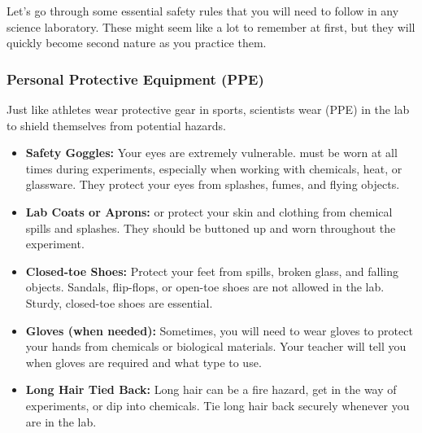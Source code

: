 Let’s go through some essential safety rules that you will need to follow in any science laboratory. These might seem like a lot to remember at first, but they will quickly become second nature as you practice them.

\subsubsection{Personal Protective Equipment (PPE)}

Just like athletes wear protective gear in sports, scientists wear  (PPE) in the lab to shield themselves from potential hazards.

\begin{itemize}
    \item \textbf{Safety Goggles:}  Your eyes are extremely vulnerable.  must be worn at all times during experiments, especially when working with chemicals, heat, or glassware. They protect your eyes from splashes, fumes, and flying objects.
    \item \textbf{Lab Coats or Aprons:}   or  protect your skin and clothing from chemical spills and splashes. They should be buttoned up and worn throughout the experiment.
    \item \textbf{Closed-toe Shoes:}  Protect your feet from spills, broken glass, and falling objects. Sandals, flip-flops, or open-toe shoes are not allowed in the lab. Sturdy, closed-toe shoes are essential.
    \item \textbf{Gloves (when needed):}  Sometimes, you will need to wear gloves to protect your hands from chemicals or biological materials. Your teacher will tell you when gloves are required and what type to use.
    \item \textbf{Long Hair Tied Back:}  Long hair can be a fire hazard, get in the way of experiments, or dip into chemicals. Tie long hair back securely whenever you are in the lab.
\end{itemize}

